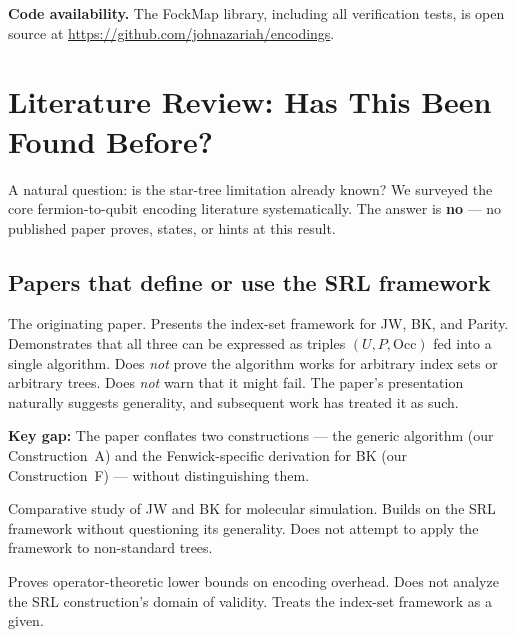 \documentclass[11pt,a4paper]{article}
\theoremstyle{definition}
\begin{document}
\bigskip

\noindent\textbf{Code availability.}
The FockMap library, including all verification tests, is open source
at \url{https://github.com/johnazariah/encodings}.

\section{Literature Review: Has This Been Found Before?}
\label{sec:prior-work}

A natural question: is the star-tree limitation already known?  We
surveyed the core fermion-to-qubit encoding literature systematically.
The answer is \textbf{no} --- no published paper proves, states, or
hints at this result.

\subsection{Papers that define or use the SRL framework}

\begin{description}[leftmargin=1.5cm]
  \item[Seeley, Richard \& Love (2012)~\cite{seeley2012}.]
    The originating paper.  Presents the index-set framework for JW,
    BK, and Parity.  Demonstrates that all three can be expressed as
    triples $(U, P, \mathrm{Occ})$ fed into a single algorithm.  Does
    \emph{not} prove the algorithm works for arbitrary index sets or
    arbitrary trees.  Does \emph{not} warn that it might fail.  The
    paper's presentation naturally suggests generality, and subsequent
    work has treated it as such.

    \textbf{Key gap:} The paper conflates two constructions --- the
    generic algorithm (our Construction~A) and the Fenwick-specific
    derivation for BK (our Construction~F) --- without distinguishing
    them.

  \item[Tranter et al.\ (2015)~\cite{tranter2015}.]
    Comparative study of JW and BK for molecular simulation.  Builds
    on the SRL framework without questioning its generality.  Does not
    attempt to apply the framework to non-standard trees.

  \item[Havl\'{i}\v{c}ek, Troyer \& Whitfield (2017)~\cite{havlicek2017}.]
    Proves operator-theoretic lower bounds on encoding overhead.  Does
    not analyze the SRL construction's domain of validity.  Treats the
    index-set framework as a given.
\end{description}
\end{document}
